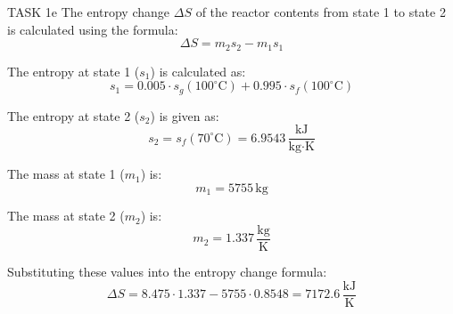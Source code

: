 TASK 1e  
The entropy change \( \Delta S \) of the reactor contents from state 1 to state 2 is calculated using the formula:  
\[
\Delta S = m_2 s_2 - m_1 s_1
\]

The entropy at state 1 (\( s_1 \)) is calculated as:  
\[
s_1 = 0.005 \cdot s_g(100^\circ\text{C}) + 0.995 \cdot s_f(100^\circ\text{C})
\]

The entropy at state 2 (\( s_2 \)) is given as:  
\[
s_2 = s_f(70^\circ\text{C}) = 6.9543 \, \frac{\text{kJ}}{\text{kg·K}}
\]

The mass at state 1 (\( m_1 \)) is:  
\[
m_1 = 5755 \, \text{kg}
\]

The mass at state 2 (\( m_2 \)) is:  
\[
m_2 = 1.337 \, \frac{\text{kg}}{\text{K}}
\]

Substituting these values into the entropy change formula:  
\[
\Delta S = 8.475 \cdot 1.337 - 5755 \cdot 0.8548 = 7172.6 \, \frac{\text{kJ}}{\text{K}}
\]